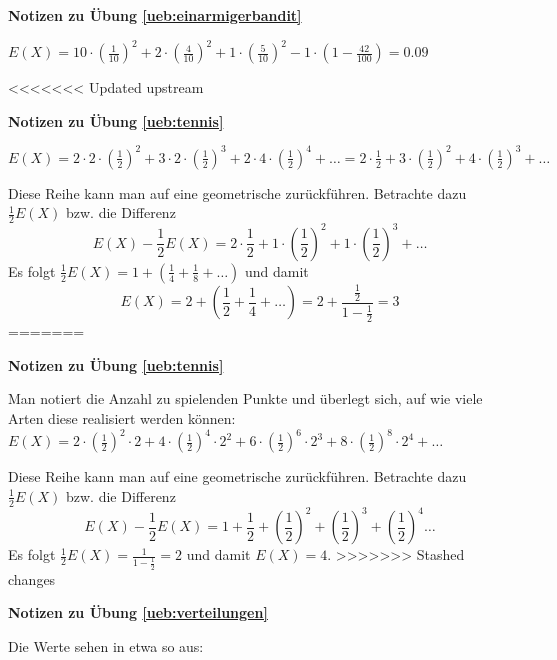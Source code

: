 \documentclass[%
<<<<<<< Updated upstream
11pt,%
twoside,%
titlepage,%
german,%
=======
11pt,%
twoside,%
titlepage,%
swissgerman,%
>>>>>>> Stashed changes
headsepline%
]{scrartcl}
\newcommand{\faReturnGray}{\textcolor{gray}{\faMailReply}} %
\theoremstyle{definition}
\theoremstyle{plain}
\newcommand{\concatueb}[1]{ueb:#1}%
\newcommand{\concatlsg}[1]{lsg:#1}%
\newenvironment{lsg}[1]{%
    \par\noindent\textbf{Notizen zu Übung \ref{\concatueb{#1}}}\label{\concatlsg{#1}}
    \hfill\hyperref[\concatueb{#1}]{\faReturnGray}\par %
}{%
    \par%
}
\newcommand{\concatueb}[1]{ueb:#1}%
\newcommand{\concatlsg}[1]{lsg:#1}%
\newenvironment{lsg}[1]{%
    \par\noindent\textbf{Notizen zu Übung \ref{\concatueb{#1}}.}%
    \label{\concatlsg{#1}}
}{%
    \par%
}
\begin{document}
\begin{lsg}{einarmigerbandit}
    $E(X)=10\cdot(\frac{1}{10})^2+2\cdot(\frac{4}{10})^2+1\cdot(\frac{5}{10})^2-1\cdot(1-\frac{42}{100})=0.09$
\end{lsg}
<<<<<<< Updated upstream
\begin{lsg}{tennis}
    $E(X)=2\cdot2\cdot(\frac{1}{2})^2+3\cdot2\cdot(\frac{1}{2})^3+2\cdot4\cdot(\frac{1}{2})^4+\dots=2\cdot\frac{1}{2}+3\cdot(\frac{1}{2})^2+4\cdot(\frac{1}{2})^3+\dots$

    Diese Reihe kann man auf eine geometrische zurückführen. Betrachte dazu $\frac{1}{2}E(X)$ bzw. die Differenz
    $$E(X)-\frac{1}{2}E(X)=2\cdot\frac{1}{2}+1\cdot(\frac{1}{2})^2+1\cdot(\frac{1}{2})^3+\dots$$
    Es folgt $\frac{1}{2}E(X)=1+(\frac{1}{4}+\frac{1}{8}+\dots)$ und damit
    $$E(X)=2+(\frac{1}{2}+\frac{1}{4}+\dots)=2+\frac{\frac{1}{2}}{1-\frac{1}{2}}=3$$
=======

\begin{lsg}{tennis}
    Man notiert die Anzahl zu spielenden Punkte und überlegt sich, auf wie viele Arten diese realisiert werden können: $E(X)=2\cdot(\frac{1}{2})^2\cdot2+4\cdot(\frac{1}{2})^4\cdot2^2+6\cdot(\frac{1}{2})^6\cdot2^3+8\cdot(\frac{1}{2})^8\cdot 2^4+\dots$

    Diese Reihe kann man auf eine geometrische zurückführen. Betrachte dazu $\frac{1}{2}E(X)$ bzw. die Differenz
    $$E(X)-\frac{1}{2}E(X)=1+\frac{1}{2}+\left(\frac{1}{2}\right)^2+\left(\frac{1}{2}\right)^3+\left(\frac{1}{2}\right)^4\dots$$
    Es folgt $\frac{1}{2}E(X)=\frac{1}{1-\frac{1}{2}}=2$ und damit $E(X)=4$.
>>>>>>> Stashed changes
\end{lsg}
\begin{lsg}{verteilungen}
    Die Werte sehen in etwa so aus:

\begin{center}
\end{center}
\end{lsg}
\end{lsg}
\end{document}
